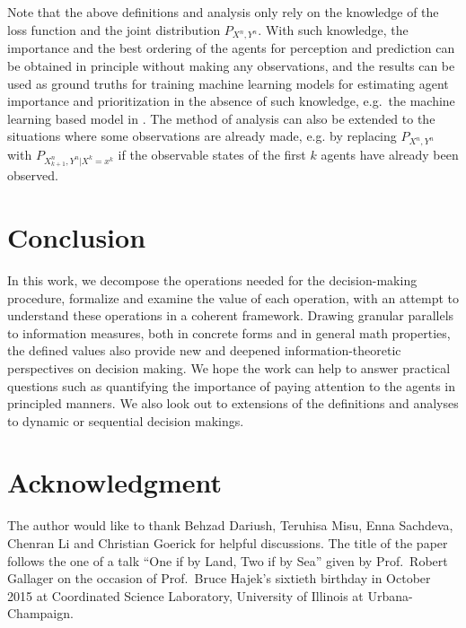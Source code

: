 \documentclass{article}
\newcommand{\E}{\mathbb{E}}
\begin{document}
Note that the above definitions and analysis only rely on the knowledge of the loss function and the joint distribution $P_{X^n,Y^n}$. With such knowledge, the importance and the best ordering of the agents for perception and prediction can be obtained in principle without making any observations, and the results can be used as ground truths for training machine learning models for estimating agent importance and prioritization in the absence of such knowledge, e.g.\ the machine learning based model in \cite{rank2tell}.
The method of analysis can also be extended to the situations where some observations are already made, e.g. by replacing $P_{X^n,Y^n}$ with $P_{X^{n}_{k+1},Y^n|X^k=x^{k}}$ if the observable states of the first $k$ agents have already been observed. 

\section{Conclusion}
In this work, we  decompose the operations needed for the decision-making procedure, formalize and examine the value of each operation, with an attempt to understand these operations in a coherent framework. Drawing granular parallels to information measures, both in concrete forms and in general math properties, 
the defined values  also provide new and deepened information-theoretic perspectives on decision making. We hope the work can help to answer practical questions such as quantifying the importance of paying attention to the agents in principled manners. 
We also look out to extensions of the definitions and analyses to dynamic or sequential decision makings. 

\section*{Acknowledgment}
The author would like to thank Behzad Dariush, Teruhisa Misu, Enna Sachdeva, Chenran Li and Christian Goerick for helpful discussions.
The title of the paper follows the one of a talk ``One if by Land, Two if by Sea'' given by Prof.\ Robert Gallager \cite{Gallager_talk_2015} on the occasion of Prof.\ Bruce Hajek's sixtieth birthday in October 2015 at Coordinated Science Laboratory, University of Illinois at Urbana-Champaign.
\end{document}
